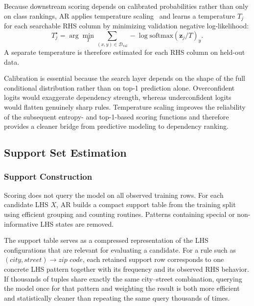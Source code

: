 \documentclass[conference]{IEEEtran}
\begin{document}
Because downstream scoring depends on calibrated probabilities rather than only on class rankings, AR applies temperature scaling~\cite{temp_scaling} and learns a temperature $T_j$ for each searchable RHS column by minimizing validation negative log-likelihood:
\begin{equation}
    T_j^\star = \arg\min_T \sum_{(x,y)\in \mathcal{D}_{\mathrm{val}}} -\log \mathrm{softmax}(\mathbf{z}_j/T)_y.
\end{equation}
A separate temperature is therefore estimated for each RHS column on held-out data.

Calibration is essential because the search layer depends on the shape of the full conditional distribution rather than on top-1 prediction alone. Overconfident logits would exaggerate dependency strength, whereas underconfident logits would flatten genuinely sharp rules. Temperature scaling improves the reliability of the subsequent entropy- and top-1-based scoring functions and therefore provides a cleaner bridge from predictive modeling to dependency ranking.

\subsection{Support Set Estimation}\label{sec:support}

\subsubsection{Support Construction}

Scoring does not query the model on all observed training rows. For each candidate LHS $X$, AR builds a compact support table from the training split using efficient grouping and counting routines. Patterns containing special or non-informative LHS states are removed.

The support table serves as a compressed representation of the LHS configurations that are relevant for evaluating a candidate. For a rule such as $(\textit{city}, \textit{street}) \to \textit{zip code}$, each retained support row corresponds to one concrete LHS pattern together with its frequency and its observed RHS behavior. If thousands of tuples share exactly the same city--street combination, querying the model once for that pattern and weighting the result is both more efficient and statistically cleaner than repeating the same query thousands of times.
\end{document}
